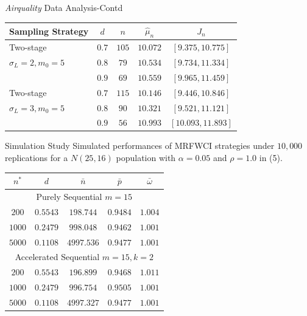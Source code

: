 \documentclass [xcolor=svgnames, t] {beamer}
\begin{document}
\begin{frame}{\textit{Airquality} Data Analysis-Contd}
  \vspace{5mm}
    \begin{center}
\begin{tabular}{l c c c c} 
 \hline
 Sampling Strategy & $d$ & $n$ & $\hat{\mu}_n$ & $J_n$  \\  
  \hline
{Two-stage }  & $0.7$ & $105$ &$10.072$ & $[9.375,10.775]$  \\ 
 $\sigma_L=2,m_0=5$ & $0.8$ & $79$ & $10.534$ & $[9.734,11.334]$ \\
  & $0.9$ & $69$ & $10.559$ & $[9.965,11.459]$\\
 \hline
{Two-stage }  & $0.7$ & $115$ & $10.146$ & $[9.446,10.846]$  \\ 
 $\sigma_L=3,m_0=5$ & $0.8$ & $90$ & $10.321$ & $[9.521,11.121]$ \\
  & $0.9$ & $56$ & $10.993$ & $[10.093,11.893]$\\
 \hline
\end{tabular}
\end{center}
\end{frame}
\begin{frame}{Simulation Study}
  \vspace{5mm}
Simulated performances of  MRFWCI strategies under $10,000$ replications for a 
$N(25,16)$ population with $\alpha=0.05$ and $\rho=1.0$ in (5).
 \begin{center}
\begin{tabular}{c c c c c} 
 \hline
 $n^*$ & $d$ & $\bar{n}$ & $\bar{p}$ & $\bar{\omega}$\\
 \hline
 \multicolumn{5}{c}{Purely Sequential $m=15$}\\
  \hline
 $200$ & $0.5543$ & $198.744$ & $0.9484$  & $1.004$\\ 
 $1000$ & $0.2479$ & $998.048$ & $0.9462$ & $1.001$ \\ 
  $5000$ & $0.1108$ & $4997.536$ & $0.9477$ & $1.001$ \\ 
  \hline
 \multicolumn{5}{c}{Accelerated Sequential $m=15,k=2$}\\
 \hline
 $200$ & $0.5543$ & $196.899$ & $0.9468$ & $1.011$ \\ 
 $1000$ & $0.2479$ & $996.754$ & $0.9505$  & $1.001$\\ 
  $5000$ & $0.1108$ & $4997.327$ & $0.9477$  & $1.001$\\ 
 \hline
\end{tabular}
\end{center}
    
\end{frame}
\end{document}
